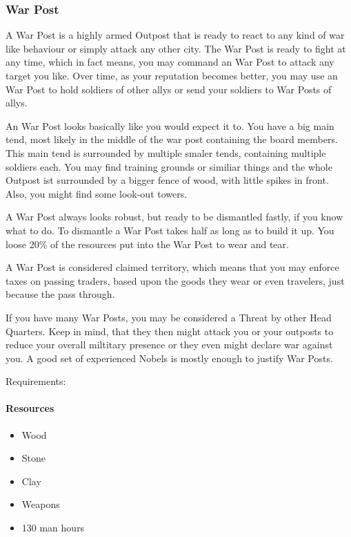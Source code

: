 \subsubsection{War Post}

A War Post is a highly armed Outpost that is ready to react to any kind of war like behaviour or simply attack any other city. The War Post is ready to fight at any time, which in fact means, you may command an War Post to attack any target you like. Over time, as your reputation becomes better, you may use an War Post to hold soldiers of other allys or send your soldiers to War Posts of allys.

An War Post looks basically like you would expect it to. You have a big main tend, most likely in the middle of the war post containing the board members. This main tend is surrounded by multiple smaler tends, containing multiple soldiers each. You may find training grounds or similiar things and the whole Outpost ist surrounded by a bigger fence of wood, with little spikes in front. Also, you might find some look-out towers.

A War Post always looks robust, but ready to be dismantled fastly, if you know what to do. To dismantle a War Post takes half as long as to build it up. You loose 20\% of the resources put into the War Post to wear and tear.

A War Post is considered claimed territory, which means that you may enforce taxes on passing traders, based upon the goods they wear or even travelers, just because the pass through.

If you have many War Posts, you may be considered a Threat by other Head Quarters. Keep in mind, that they then might attack you or your outposts to reduce your overall miltitary presence or they even might declare war against you. A good set of experienced Nobels is mostly enough to justify War Posts.

Requirements:

\paragraph{Resources}
\begin{itemize}
\item Wood
\item Stone
\item Clay
\item Weapons
\item 130 man hours
\end{itemize}

